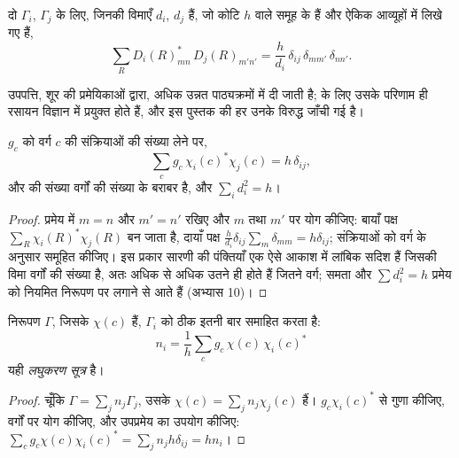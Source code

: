 \begin{theorem}[महान लांबिकता प्रमेय]\label{thm:b3:group-theory-applied:great-orthogonality}
दो  $\Gamma_i$, $\Gamma_j$ के लिए, जिनकी विमाएँ $d_i$,
$d_j$ हैं, जो कोटि $h$ वाले समूह के हैं और ऐकिक आव्यूहों में लिखे गए हैं,
\[
\sum_R D_i(R)_{mn}^*\,D_j(R)_{m'n'} = \frac{h}{d_i}\,\delta_{ij}\,\delta_{mm'}\,\delta_{nn'}.
\]
\end{theorem}
\admitted

उपपत्ति, शूर की प्रमेयिकाओं द्वारा, अधिक उन्नत पाठ्यक्रमों में दी जाती है;
 के लिए उसके परिणाम ही रसायन विज्ञान में प्रयुक्त होते हैं, और इस पुस्तक की
हर  उनके विरुद्ध जाँची गई है।

\begin{corollary}[अभिलक्षणों की लांबिकता]\label{cor:b3:group-theory-applied:characters}
$g_c$ को वर्ग $c$ की संक्रियाओं की संख्या लेने पर,
\[
\sum_cg_c\,\chi_i(c)^*\chi_j(c) = h\,\delta_{ij},
\]
और  की संख्या वर्गों की संख्या के बराबर है,
और $\sum_id_i^2 = h$।
\end{corollary}

\begin{proof}
प्रमेय में $m = n$ और $m' = n'$ रखिए और $m$ तथा $m'$ पर योग कीजिए: बायाँ
पक्ष $\sum_R\chi_i(R)^*\chi_j(R)$ बन जाता है, दायाँ पक्ष $\frac{h}{d_i}\delta_{ij}
\sum_{m}\delta_{mm} = h\delta_{ij}$; संक्रियाओं को वर्ग के अनुसार समूहित कीजिए। इस प्रकार
सारणी की पंक्तियाँ एक ऐसे आकाश में लांबिक सदिश हैं जिसकी विमा
वर्गों की संख्या है, अतः  अधिक से अधिक उतने ही होते हैं
जितने वर्ग; समता और $\sum d_i^2 = h$ प्रमेय को
नियमित निरूपण पर लगाने से आते हैं (अभ्यास 10)।
\end{proof}

\begin{theorem}[लघुकरण सूत्र]\label{thm:b3:group-theory-applied:reduction}
निरूपण $\Gamma$, जिसके  $\chi(c)$ हैं,  $\Gamma_i$ को ठीक इतनी बार समाहित करता है:
\[
n_i = \frac1h\sum_cg_c\,\chi(c)\,\chi_i(c)^*
\]
यही \emph{लघुकरण सूत्र} है।
\end{theorem}

\begin{proof}
चूँकि $\Gamma = \sum_jn_j\Gamma_j$, उसके  $\chi(c) = \sum_jn_j\chi_j(c)$ हैं।
$g_c\chi_i(c)^*$ से गुणा कीजिए, वर्गों पर योग कीजिए, और उपप्रमेय का उपयोग कीजिए:
$\sum_cg_c\chi(c)\chi_i(c)^* = \sum_jn_jh\delta_{ij} = hn_i$।
\end{proof}

